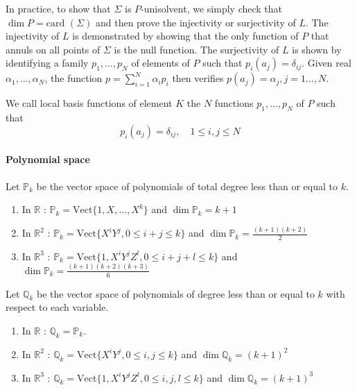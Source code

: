 \begin{Rem}
	In practice, to show that $\Sigma$ is $P$-unisolvent, we simply check that $\dim P= \text{card } (\Sigma)$ and then prove the injectivity or surjectivity of $L$. The injectivity of $L$ is demonstrated by showing that the only function of $P$ that annuls on all points of $\Sigma$ is the null function. The surjectivity of $L$ is shown by identifying a family $p_1,\dots,p_N$ of elements of $P$ such that $p_i(a_j)=\delta_{ij}$. Given real $\alpha_1,\dots,\alpha_N$, the function $p=\sum_{i=1}^N\alpha_i p_i$ then verifies $p(a_j)=\alpha_j,j=1\dots,N$. 
\end{Rem}

\begin{Rem}
	We call local basis functions of element $K$ the $N$ functions $p_1,\dots,p_N$ of $P$ such that
	\begin{equation*}
		p_i(a_j)=\delta_{ij},\quad 1\le i,j\le N
	\end{equation*}
\end{Rem}

\paragraph{Polynomial space}

Let $\mathbb{P}_k$ be the vector space of polynomials of total degree less than or equal to $k$.

\begin{enumerate}[label=\textbullet]
	\item In $\mathbb{R}$ : $\mathbb{P}_k=\text{Vect}\{1,X,\dots,X^k\}$ and $\dim\mathbb{P}_k=k+1$ 
	\item In $\mathbb{R}^2$ : $\mathbb{P}_k=\text{Vect}\{X^iY^j,0\le i+j\le k\}$ and $\dim\mathbb{P}_k=\frac{(k+1)(k+2)}{2}$
	\item In $\mathbb{R}^3$ : $\mathbb{P}_k=\text{Vect}\{1,X^iY^jZ^l,0\le i+j+l\le k\}$ and $\dim\mathbb{P}_k=\frac{(k+1)(k+2)(k+3)}{6}$
\end{enumerate}

Let $\mathbb{Q}_k$ be the vector space of polynomials of degree less than or equal to $k$ with respect to each variable.

\begin{enumerate}[label=\textbullet]
	\item In $\mathbb{R}$ : $\mathbb{Q}_k=\mathbb{P}_k$. 
	\item In $\mathbb{R}^2$ : $\mathbb{Q}_k=\text{Vect}\{X^iY^j,0\le i,j\le k\}$ and $\dim\mathbb{Q}_k=(k+1)^2$
	\item In $\mathbb{R}^3$ : $\mathbb{Q}_k=\text{Vect}\{1,X^iY^jZ^l,0\le i,j,l\le k\}$ and $\dim\mathbb{Q}_k=(k+1)^3$
\end{enumerate}

